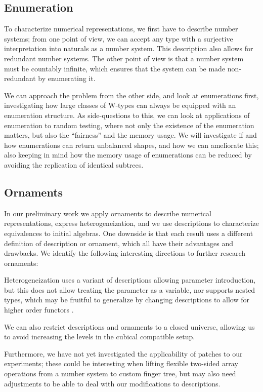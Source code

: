 \subsection{Enumeration}
To characterize numerical representations, we first have to describe number systems; from one point of view, we can accept any type with a surjective interpretation into naturals as a number system. This description also allows for redundant number systems. The other point of view is that a number system must be countably infinite, which ensures that the system can be made non-redundant by enumerating it.

We can approach the problem from the other side, and look at enumerations first, investigating how large classes of W-types can always be equipped with an enumeration structure. As side-questions to this, we can look at applications of enumeration to random testing, where not only the existence of the enumeration matters, but also the ``fairness'' and the memory usage. We will investigate if and how enumerations can return unbalanced shapes, and how we can ameliorate this; also keeping in mind how the memory usage of enumerations can be reduced by avoiding the replication of identical subtrees.

\subsection{Ornaments}
In our preliminary work we apply ornaments to describe numerical representations, express heterogeneization, and we use descriptions to characterize equivalences to initial algebras. One downside is that each result uses a different definition of description or ornament, which all have their advantages and drawbacks. We identify the following interesting directions to further research ornaments:

Heterogeneization uses a variant of descriptions allowing parameter introduction, but this does not allow treating the parameter as a variable, nor supports nested types, which may be fruitful to generalize by changing descriptions to allow for higher order functors \cite{initenough}.

We can also restrict descriptions and ornaments to a closed universe, allowing us to avoid increasing the levels in the cubical compatible setup.  

Furthermore, we have not yet investigated the applicability of patches \cite{orntrans} to our experiments; these could be interesting when lifting flexible two-sided array operations from a number system to custom finger tree, but may also need adjustments to be able to deal with our modifications to descriptions.

